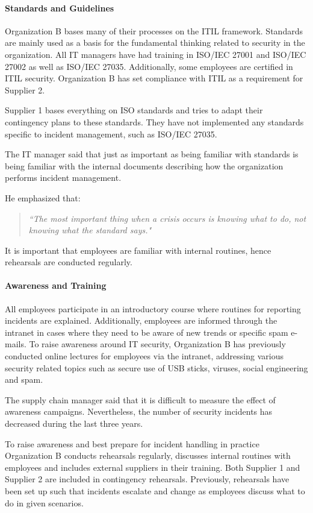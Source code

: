 \paragraph{Standards and Guidelines}
Organization B bases many of their processes on the ITIL framework. Standards are mainly used as a basis for the fundamental thinking related to security in the organization. All IT managers have had training in ISO/IEC 27001 and ISO/IEC 27002 as well as ISO/IEC 27035. Additionally, some employees are certified in ITIL security. Organization B has set compliance with \ac{ITIL} as a requirement for Supplier 2. %

Supplier 1 bases everything on \acs{ISO} standards and tries to adapt their contingency plans to these standards. They have not implemented any standards specific to incident management, such as \acs{ISO}/\acs{IEC} 27035. 

The IT manager said that just as important as being familiar with standards is being familiar with the internal documents describing how the organization performs incident management. 

He emphasized that:
\begin{quote}
\textit{``The most important thing when a crisis occurs is knowing what to do, not knowing what the standard says."}
\end{quote}
It is important that employees are familiar with internal routines, hence rehearsals are conducted regularly.

\paragraph{Awareness and Training}
All employees participate in an introductory course where routines for reporting incidents are explained. Additionally, employees are informed through the intranet in cases where they need to be aware of new trends or specific spam e-mails. To raise awareness around IT security, Organization B has previously conducted online lectures for employees via the intranet, addressing various security related topics such as secure use of USB sticks, viruses, social engineering and spam. 

The supply chain manager said that it is difficult to measure the effect of awareness campaigns. Nevertheless, the number of security incidents has decreased during the last three years. 

To raise awareness and best prepare for incident handling in practice Organization B conducts rehearsals regularly, discusses internal routines with employees and includes external suppliers in their training. Both Supplier 1 and Supplier 2 are included in contingency rehearsals. Previously, rehearsals have been set up such that incidents escalate and change as employees discuss what to do in given scenarios. 

